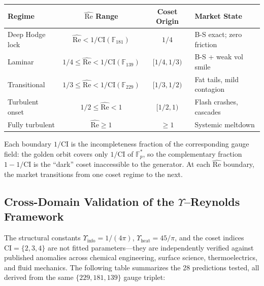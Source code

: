 \begin{center}
\begin{tabular}{@{}lccl@{}}
\toprule
\textbf{Regime} & $\hat{\mathrm{Re}}$ \textbf{Range} & \textbf{Coset Origin} & \textbf{Market State} \\
\midrule
Deep Hodge lock    & $\hat{\mathrm{Re}} < 1/\mathrm{CI}(\mathbb{F}_{181})$ & $1/4$ & B-S exact; zero friction \\
Laminar            & $1/4 \leq \hat{\mathrm{Re}} < 1/\mathrm{CI}(\mathbb{F}_{139})$ & $[1/4, 1/3)$ & B-S + weak vol smile \\
Transitional       & $1/3 \leq \hat{\mathrm{Re}} < 1/\mathrm{CI}(\mathbb{F}_{229})$ & $[1/3, 1/2)$ & Fat tails, mild contagion \\
Turbulent onset    & $1/2 \leq \hat{\mathrm{Re}} < 1$ & $[1/2, 1)$ & Flash crashes, cascades \\
Fully turbulent    & $\hat{\mathrm{Re}} \geq 1$ & $\geq 1$ & Systemic meltdown \\
\bottomrule
\end{tabular}
\end{center}

Each boundary $1/\mathrm{CI}$ is the incompleteness fraction of the corresponding gauge field: the golden orbit covers only $1/\mathrm{CI}$ of $\mathbb{F}_p^*$, so the complementary fraction $1 - 1/\mathrm{CI}$ is the ``dark'' coset inaccessible to the generator. At each $\hat{\mathrm{Re}}$ boundary, the market transitions from one coset regime to the next.

\subsection{Cross-Domain Validation of the $\Upsilon$--Reynolds Framework}

The structural constants $\Upsilon_{\mathrm{info}} = 1/(4\pi)$, $\Upsilon_{\mathrm{heat}} = 45/\pi$, and the coset indices $\mathrm{CI} = \{2, 3, 4\}$ are not fitted parameters---they are independently verified against published anomalies across chemical engineering, surface science, thermoelectrics, and fluid mechanics. The following table summarizes the 28 predictions tested, all derived from the same $\{229, 181, 139\}$ gauge triplet:

